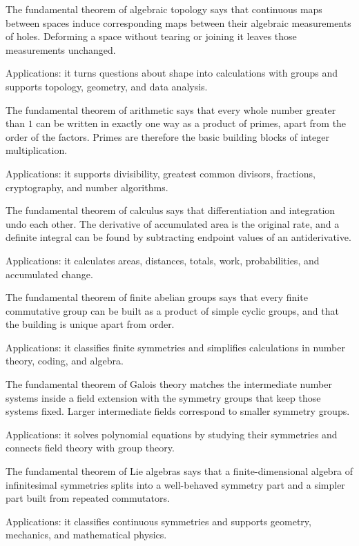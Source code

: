 The fundamental theorem of algebraic topology says that continuous maps between spaces induce corresponding maps between their algebraic measurements of holes. Deforming a space without tearing or joining it leaves those measurements unchanged. \par\noindent Applications: it turns questions about shape into calculations with groups and supports topology, geometry, and data analysis.

The fundamental theorem of arithmetic says that every whole number greater than $1$ can be written in exactly one way as a product of primes, apart from the order of the factors. Primes are therefore the basic building blocks of integer multiplication. \par\noindent Applications: it supports divisibility, greatest common divisors, fractions, cryptography, and number algorithms.

The fundamental theorem of calculus says that differentiation and integration undo each other. The derivative of accumulated area is the original rate, and a definite integral can be found by subtracting endpoint values of an antiderivative. \par\noindent Applications: it calculates areas, distances, totals, work, probabilities, and accumulated change.

The fundamental theorem of finite abelian groups says that every finite commutative group can be built as a product of simple cyclic groups, and that the building is unique apart from order. \par\noindent Applications: it classifies finite symmetries and simplifies calculations in number theory, coding, and algebra.

The fundamental theorem of Galois theory matches the intermediate number systems inside a field extension with the symmetry groups that keep those systems fixed. Larger intermediate fields correspond to smaller symmetry groups. \par\noindent Applications: it solves polynomial equations by studying their symmetries and connects field theory with group theory.

The fundamental theorem of Lie algebras says that a finite-dimensional algebra of infinitesimal symmetries splits into a well-behaved symmetry part and a simpler part built from repeated commutators. \par\noindent Applications: it classifies continuous symmetries and supports geometry, mechanics, and mathematical physics.

